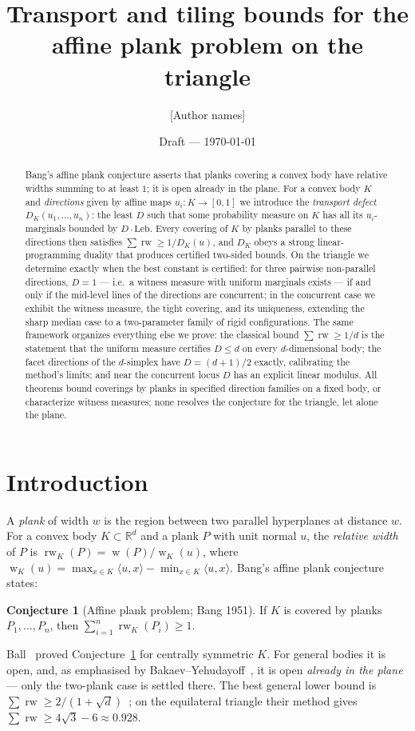 \documentclass[11pt,reqno]{amsart}
\title{Transport and tiling bounds for the affine plank problem on the triangle}
\author{[Author names]}
\date{Draft --- \today}
\theoremstyle{plain}
\theoremstyle{definition}
\newtheorem{conjecture}[theorem]{Conjecture}
\theoremstyle{remark}
\newcommand{\rw}{\operatorname{rw}}
\newcommand{\R}{\mathbb{R}}
\DeclareMathOperator{\wid}{w}
\begin{document}
\begin{abstract}
Bang's affine plank conjecture asserts that planks covering a convex body have
relative widths summing to at least $1$; it is open already in the plane. For a
convex body $K$ and \emph{directions} given by affine maps $u_i:K\to[0,1]$ we
introduce the \emph{transport defect} $D_K(u_1,\dots,u_n)$: the least $D$ such
that some probability measure on $K$ has all its $u_i$-marginals bounded by
$D\cdot\mathrm{Leb}$. Every covering of $K$ by planks parallel to these
directions then satisfies $\sum\rw\ge1/D_K(u)$, and $D_K$ obeys a strong
linear-programming duality that produces certified two-sided bounds. On the
triangle we determine exactly when the best constant is certified: for three
pairwise non-parallel directions, $D=1$ --- i.e.\ a witness measure with uniform
marginals exists --- if and only if the mid-level lines of the directions are
concurrent; in the concurrent case we exhibit the witness measure, the tight
covering, and its uniqueness, extending the sharp median case to a
two-parameter family of rigid configurations. The same framework organizes
everything else we prove: the classical bound $\sum\rw\ge1/d$ is the statement
that the uniform measure certifies $D\le d$ on every $d$-dimensional body; the
facet directions of the $d$-simplex have $D=(d+1)/2$ exactly, calibrating the
method's limits; and near the concurrent locus $D$ has an explicit linear
modulus. All theorems bound coverings by planks in specified direction families
on a fixed body, or characterize witness measures; none resolves the conjecture
for the triangle, let alone the plane.
\end{abstract}
\maketitle

\section{Introduction}\label{sec:intro}

A \emph{plank} of width $w$ is the region between two parallel hyperplanes at
distance $w$. For a convex body $K\subset\R^d$ and a plank $P$ with unit normal $u$,
the \emph{relative width} of $P$ is $\rw_K(P)=\wid(P)/\wid_K(u)$, where
$\wid_K(u)=\max_{x\in K}\langle u,x\rangle-\min_{x\in K}\langle u,x\rangle$. Bang's
affine plank conjecture~\cite{Bang51,Ambrus} states:
\begin{conjecture}[Affine plank problem; Bang 1951]\label{conj:bang}
If $K$ is covered by planks $P_1,\dots,P_n$, then $\sum_{i=1}^n \rw_K(P_i)\ge 1$.
\end{conjecture}
Ball~\cite{Ball91} proved Conjecture~\ref{conj:bang} for centrally symmetric $K$.
For general bodies it is open, and, as emphasised by Bakaev--Yehudayoff~\cite{BY26},
it is open \emph{already in the plane} --- only the two-plank case is settled there.
The best general lower bound is
$\sum\rw\ge 2/(1+\sqrt d)$~\cite{BY26}; on the equilateral triangle their method
gives $\sum\rw\ge 4\sqrt3-6\approx0.928$.
\end{document}
